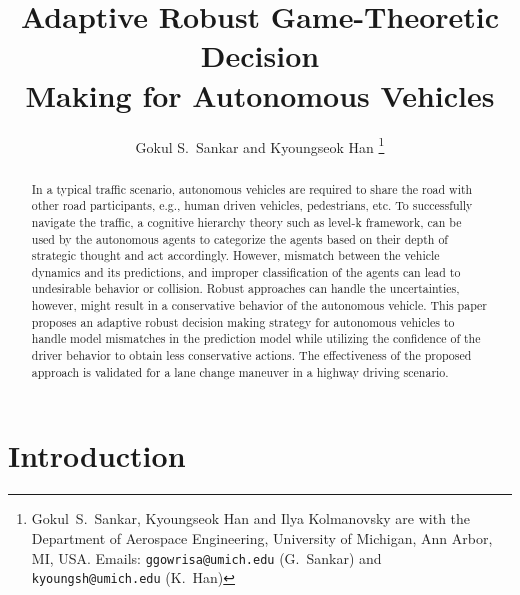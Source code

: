 \documentclass[10pt,journal]{IEEEtran}
\begin{document}
	
	\title{Adaptive Robust Game-Theoretic Decision \\ Making for Autonomous Vehicles}

	\thispagestyle{empty}

	\author{
		Gokul S.~Sankar and  Kyoungseok Han %
		\thanks{Gokul~S.~Sankar,  Kyoungseok Han and Ilya Kolmanovsky are with the Department of Aerospace Engineering, University of Michigan, Ann Arbor, MI, USA. Emails: {\tt\small ggowrisa@umich.edu} (G.~Sankar) and  
			{\tt\small kyoungsh@umich.edu} (K.~Han) }%
	}

	\maketitle
	
	
	
	\begin{abstract}
		
		In a typical traffic scenario, autonomous vehicles are required to share the road with other road participants, e.g., human driven vehicles, pedestrians, etc. To successfully navigate the traffic, a cognitive hierarchy theory such as level-k framework, can be used by the autonomous agents to categorize the agents based on their depth of strategic thought and act accordingly. However, mismatch between the vehicle dynamics and its predictions, and improper classification of the agents can lead to undesirable behavior or collision. Robust approaches can handle the  uncertainties, however, might result in a conservative behavior of the autonomous vehicle. This paper proposes an adaptive robust decision making strategy for autonomous vehicles to handle model mismatches in the prediction model while utilizing the confidence of the driver behavior to obtain less conservative actions. The effectiveness of the proposed approach is validated for a lane change maneuver in a highway driving scenario.
	
	\end{abstract}
	
	

	
	\section{Introduction}
	\label{sec:intro}
\end{document}
